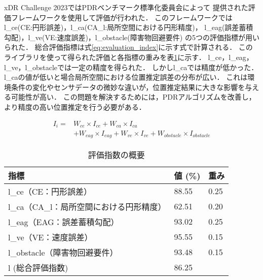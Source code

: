 xDR Challenge 2023ではPDRベンチマーク標準化委員会によって
提供された評価フレームワークを使用して評価が行われた．
このフレームワークではl\_ce(CE:円形誤差)，l\_ca(CA\_l:局所空間における円形精度)，
l\_eag(誤差蓄積勾配)，l\_ve(VE:速度誤差)，l\_obstacle(障害物回避要件)
の5つの評価指標が用いられた．
総合評価指標は式\ref{eq:evaluation_index}に示す式で計算される．
このライブラリを使って得られた評価と各指標の重みを表\ref{table:evaluation_index}に示す．
l\_ce，l\_eag， l\_ve，l\_obstacleでは一定の精度を得られた．
しかしl\_caでは精度が低かった．
l\_caの値が低いと場合局所空間における位置推定誤差の分布が広い．
これは環境条件の変化やセンサデータの微妙な違いが，位置推定結果に大きな影響を与える可能性が高い．
この問題を解決するためには，PDRアルゴリズムを改善し，より精度の高い位置推定を行う必要がある．

\begin{equation}
	\begin{aligned}
		I_i = & W_{ce} \times I_{ce} + W_{ca} \times I_{ca}                                        \\
		      & + W_{eag} \times I_{eag} + W_{ve} \times I_{ve} + W_{obstacle} \times I_{obstacle}
	\end{aligned}
	\label{eq:evaluation_index}
\end{equation}


\begin{table}[ht]
	\caption{評価指数の概要}
	\centering
	\begin{tabular}{l|l|l}
		\hline
		指標                        & 値 (\%) & 重み   \\ \hline
		l\_ce（CE：円形誤差）            & 88.55  & 0.25 \\
		l\_ca（CA\_l：局所空間における円形精度） & 62.51  & 0.20 \\
		l\_eag（EAG：誤差蓄積勾配）        & 93.02  & 0.25 \\
		l\_ve（VE：速度誤差）            & 95.55  & 0.15 \\
		l\_obstacle（障害物回避要件）      & 93.48  & 0.15 \\
		l (総合評価指数)                & 86.25  &      \\ \hline
	\end{tabular}
	\label{table:evaluation_index}
\end{table}


